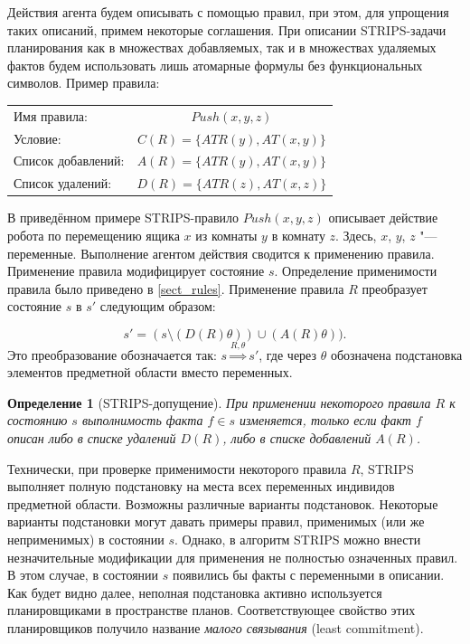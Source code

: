 \documentclass[b5paper,11pt]{book}
\newtheorem{Def}{Определение}
\numberwithin{Def}{section}
\numberwithin{Th}{chapter}
\numberwithin{St}{chapter}
\begin{document}
	Действия агента будем описывать с помощью правил, при этом, для упрощения таких описаний, примем некоторые соглашения. При описании STRIPS-задачи планирования как в множествах добавляемых, так и в множествах удаляемых фактов будем использовать  лишь атомарные формулы без функциональных символов. Пример правила:
	
	\begin{table}[H]
		\centering
		\begin{tabular}{l c}
			Имя правила: & $Push(x, y, z)$\\
			Условие: & $C(R) = \{ATR (y), AT(x, y)\}$\\
			Список добавлений: & $A(R) = \{ATR (y), AT(x, y)\}$\\
			Список удалений: & $D(R) = \{ATR (z), AT(x, z)\}$
		\end{tabular}
	\end{table}
	
	В приведённом примере STRIPS-правило $Push(x, y, z)$ описывает действие робота по перемещению ящика $x$ из комнаты $y$ в комнату $z$. Здесь, $x$, $y$, $z$ "--- переменные. Выполнение агентом действия сводится к применению правила. Применение правила модифицирует состояние $s$.	Определение применимости правила было приведено в \autoref{sect_rules}. Применение правила $R$ преобразует состояние $s$ в $s'$ следующим образом:
	
	\[
		s' = (s \setminus (D(R)\theta)) \cup (A(R)\theta)).
	\]
	Это преобразование обозначается так: $s \overset{R,\theta}{\Rightarrow} s'$, где через $\theta$ обозначена подстановка элементов предметной области вместо переменных.
	
	\begin{Def}[STRIPS-допущение]
		При применении некоторого правила $R$ к состоянию $s$ выполнимость факта $f\in s$ изменяется, только если факт $f$ описан либо в списке удалений $D(R)$, либо в списке добавлений $A(R)$.
	\end{Def}
	
	Технически, при проверке применимости некоторого правила $R$, STRIPS выполняет полную подстановку на места всех переменных индивидов предметной области. Возможны различные варианты подстановок. Некоторые варианты подстановки могут давать примеры правил, применимых (или же неприменимых) в состоянии $s$. Однако, в алгоритм STRIPS можно внести незначительные модификации для применения не полностью означенных правил. В этом случае, в состоянии $s$ появились бы факты с переменными в описании. Как будет видно далее, неполная подстановка активно используется планировщиками в пространстве планов. Соответствующее свойство этих планировщиков получило название \textit{малого связывания} (least commitment).
	
\end{document}
